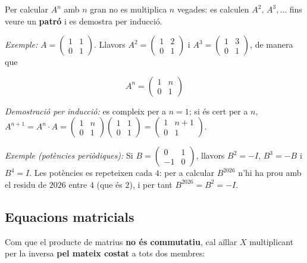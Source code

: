 Per calcular $A^n$ amb $n$ gran no es multiplica $n$ vegades: es calculen $A^2,\,A^3,\dots$ fins veure un \textbf{patró} i es demostra per inducció.

\emph{Exemple:} $A=\begin{pmatrix}1&1\\0&1\end{pmatrix}$. Llavors $A^2=\begin{pmatrix}1&2\\0&1\end{pmatrix}$ i $A^3=\begin{pmatrix}1&3\\0&1\end{pmatrix}$, de manera que

\begin{equation*}
A^n=\begin{pmatrix}1&n\\0&1\end{pmatrix}
\end{equation*}

\emph{Demostració per inducció:} es compleix per a $n=1$; si és cert per a $n$, $A^{n+1}=A^n\cdot A=\begin{pmatrix}1&n\\0&1\end{pmatrix}\begin{pmatrix}1&1\\0&1\end{pmatrix}=\begin{pmatrix}1&n+1\\0&1\end{pmatrix}$.

\emph{Exemple (potències periòdiques):} Si $B=\begin{pmatrix}0&1\\-1&0\end{pmatrix}$, llavors $B^2=-I$, $B^3=-B$ i $B^4=I$. Les potències es repeteixen cada $4$: per a calcular $B^{2026}$ n'hi ha prou amb el residu de $2026$ entre $4$ (que és $2$), i per tant $B^{2026}=B^2=-I$.

\subsection{Equacions matricials}

Com que el producte de matrius \textbf{no és commutatiu}, cal aïllar $X$ multiplicant per la inversa \textbf{pel mateix costat} a tots dos membres:

